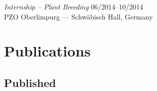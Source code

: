 \documentclass[margin,10pt,a4paper]{res}
\begin{document}
\begin{resume}


{\sl Internship -- Plant Breeding} \hfill 06/2014--10/2014 \\
PZO Oberlimpurg  --- Schwäbisch Hall, Germany


 
\section{Publications} %


\subsection{Published}
\begin{etaremune}
\setlength\itemsep{0ex}


\end{etaremune}
\end{resume}
\end{document}
